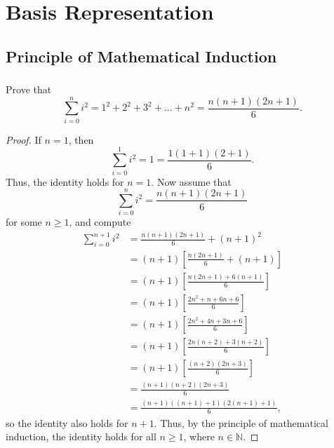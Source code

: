 \documentclass[11pt]{article}
\begin{document}
\pagestyle{fancy}
\fancyhead{}
\tableofcontents

\newpage

\section{Basis Representation}
\subsection{Principle of Mathematical Induction}
\subsubsection{}
Prove that
\[
	\sum_{i=0}^{n} i^2 = 1^2 + 2^2 + 3^2 + ... + n^2 = \frac{n(n+1)(2n+1)}{6}.
\]
\begin{proof}
	If $n=1$, then
	\[
		\sum_{i=0}^{1} i^2 = 1 = \frac{1(1+1)(2+1)}{6}.
	\]
	Thus, the identity holds for $n=1$. Now assume that
	\[
		\sum_{i=0}^{n} i^2 = \frac{n(n+1)(2n+1)}{6}
	\]
	for some $n \geq 1$, and compute
	\begin{align*}
		\sum_{i=0}^{n+1} i^2 & = \frac{n(n+1)(2n+1)}{6} + (n+1)^2 \\
				     & = (n+1) \left[ \frac{n(2n+1)}{6} + (n+1) \right] \\
				     & = (n+1) \left[ \frac{n(2n+1) + 6(n+1)}{6} \right] \\
				     & = (n+1) \left[ \frac{2n^2 + n + 6n + 6}{6} \right] \\
				     & = (n+1) \left[ \frac{2n^2 + 4n + 3n + 6}{6} \right] \\
				     & = (n+1) \left[ \frac{2n(n+2) + 3(n+2)}{6} \right] \\
				     & = (n+1) \left[ \frac{(n+2)(2n+3)}{6} \right] \\
				     & = \frac{(n+1)(n+2)(2n+3)}{6} \\
				     & = \frac{(n+1)((n+1)+1)(2(n+1)+1)}{6},
	\end{align*}
	so the identity also holds for $n+1$. Thus, by the principle of mathematical induction,
	the identity holds for all $n \geq 1$, where $n \in \mathbb{N}$.
\end{proof}

\newpage

\end{document}

